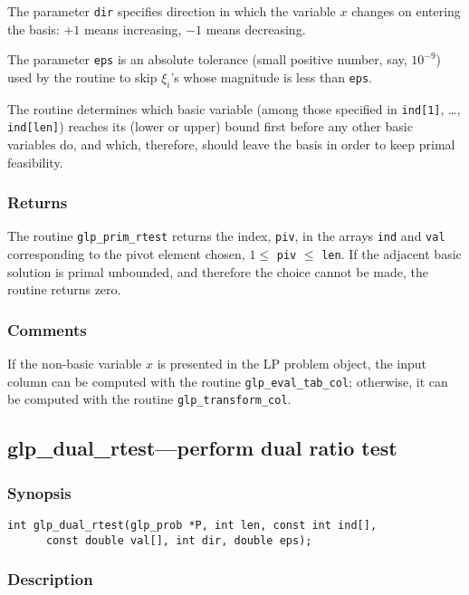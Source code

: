 The parameter \verb|dir| specifies direction in which the variable $x$
changes on entering the basis: $+1$ means increasing, $-1$ means
decreasing.

The parameter \verb|eps| is an absolute tolerance (small positive
number, say, $10^{-9}$) used by the routine to skip $\xi_i$'s whose
magnitude is less than \verb|eps|.

The routine determines which basic variable (among those specified in
\verb|ind[1]|, \dots, \verb|ind[len]|) reaches its (lower or upper)
bound first before any other basic variables do, and which, therefore,
should leave the basis in order to keep primal feasibility.

\subsubsection*{Returns}

The routine \verb|glp_prim_rtest| returns the index, \verb|piv|, in the
arrays \verb|ind| and \verb|val| corresponding to the pivot element
chosen, $1\leq$ \verb|piv| $\leq$ \verb|len|. If the adjacent basic
solution is primal unbounded, and therefore the choice cannot be made,
the routine returns zero.

\subsubsection*{Comments}

If the non-basic variable $x$ is presented in the LP problem object, the
input column can be computed with the routine \verb|glp_eval_tab_col|;
otherwise, it can be computed with the routine \verb|glp_transform_col|.

\subsection{glp\_dual\_rtest---perform dual ratio test}

\subsubsection*{Synopsis}

\begin{verbatim}
int glp_dual_rtest(glp_prob *P, int len, const int ind[],
      const double val[], int dir, double eps);
\end{verbatim}

\subsubsection*{Description}

